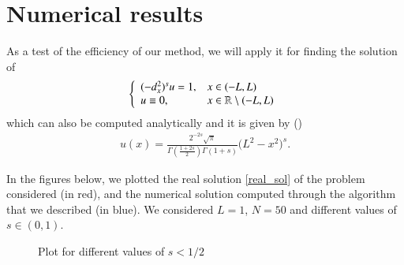 \section{Numerical results} 

As a test of the efficiency of our method, we will apply it for finding the solution of
\begin{align*}
	\left\{\begin{array}{ll}
		(-d_x^2)^{s}u = 1, & x\in(-L,L)
		\\
		u\equiv 0, & x\in\mathbb{R}\setminus(-L,L)
	\end{array}\right.
\end{align*}
which can also be computed analytically and it is given by (\cite{getoor1961first})
\begin{align}\label{real_sol}
	u(x)=\frac{2^{-2s}\sqrt{\pi}}{\Gamma\left(\frac{1+2s}{2}\right)\Gamma(1+s)}\Big(L^2-x^2\Big)^s.
\end{align}

In the figures below, we plotted the real solution \eqref{real_sol} of the problem considered (in red), and the numerical solution computed through the algorithm that we described (in blue). We considered $L=1$, $N=50$ and different values of $s\in(0,1)$.

\begin{figure}[!h]
		\hspace{1cm}
	\caption{Plot for different values of $s<1/2$}
\end{figure}

